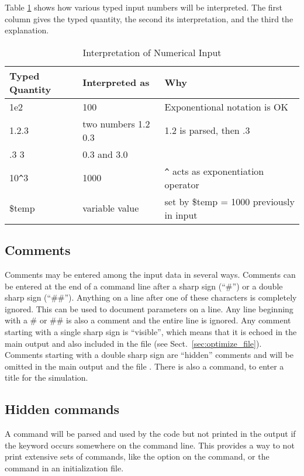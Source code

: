 Table \ref{tab:FreeFormatNumbers} shows how various typed
input numbers will be interpreted.
The first column gives the typed quantity,
the second its interpretation, and the third the explanation.

\begin{table}
\centering
\caption{\label{tab:FreeFormatNumbers}
Interpretation of Numerical Input}
\begin{tabular}{llp{12pc}}
\hline
Typed Quantity& Interpreted as& Why\\
\hline
1e2& 100& Exponentional notation is OK\\
1.2.3& two numbers 1.2 0.3& 1.2 is parsed, then .3\\
.3 3& 0.3 and 3.0\\
10\verb|^|3 & 1000 & \verb|^| acts as exponentiation operator\\
\$temp & variable value & set by \$temp = 1000 previously in input\\
\hline
\end{tabular}
\end{table}

\subsection{Comments}
\label{sec:CommentsInInput}

Comments may be entered among the input data in several ways.
Comments
can be entered at the end of a command line after
a sharp sign (``\#'')
or a double sharp sign (``\#\#'').
Anything on a line after one of these characters is completely ignored.
This can be used to document parameters on a line.
Any line beginning with
a \# or \#\# is also a comment and the entire line is ignored.
Any comment starting with a single sharp sign is ``visible'', which means that
it is echoed in the main output and also included in the file 
(see Sect.~\ref{sec:optimize_file}).
Comments starting with a double sharp sign are ``hidden'' comments and will be omitted in the main output
and the file .
There is also a  command, to enter a title for the simulation.

\subsection{Hidden commands}

A command will be parsed and used by the code but not printed in the
output if the keyword  occurs somewhere on the command line.
This
provides a way to not print extensive sets of commands, like the
option on the  command,
or the  command in an initialization file.


